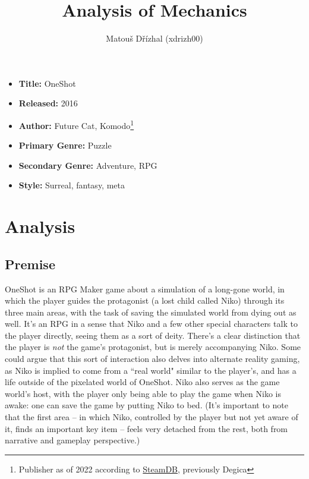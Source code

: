 \documentclass[a4paper,10pt,english]{article}
\title{%
Analysis of Mechanics%
}
\author{%
Matouš Dřízhal (xdrizh00)%
}
\date{}
\begin{document}
\maketitle
\thispagestyle{empty}

{%
\large

\begin{itemize}

\item[] \textbf{Title:} OneShot

\item[] \textbf{Released:} 2016

\item[] \textbf{Author:} Future Cat, Komodo\footnote{Publisher as of 2022 according to \href{https://steamdb.info/app/420530/history/?changeid=15417799}{SteamDB}, previously Degica}

\item[] \textbf{Primary Genre:} Puzzle

\item[] \textbf{Secondary Genre:} Adventure, RPG

\item[] \textbf{Style:} Surreal, fantasy, meta

\end{itemize}

}

\section*{\centering Analysis}

\subsection*{Premise}

OneShot is an RPG Maker game about a simulation of a long-gone world, in which the player guides the protagonist (a lost child called Niko) through its three main areas, with the task of saving the simulated world from dying out as well. It's an RPG in a sense that Niko and a few other special characters talk to the player directly, seeing them as a sort of deity. There's a clear distinction that the player is \emph{not} the game's protagonist, but is merely accompanying Niko. Some could argue that this sort of interaction also delves into alternate reality gaming, as Niko is implied to come from a ``real world" similar to the player's, and has a life outside of the pixelated world of OneShot. Niko also serves as the game world's host, with the player only being able to play the game when Niko is awake: one can save the game by putting Niko to bed. (It's important to note that the first area -- in which Niko, controlled by the player but not yet aware of it, finds an important key item -- feels very detached from the rest, both from narrative and gameplay perspective.)
\end{document}
